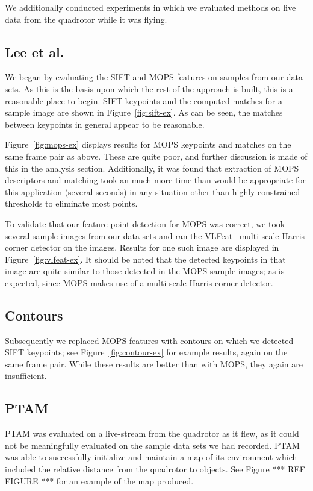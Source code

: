 \documentclass{acmsiggraph}
\begin{document}
We additionally conducted experiments in which we evaluated methods on live data from the quadrotor while it was flying.

\subsection{Lee et al.}
We began by evaluating the SIFT and MOPS features on samples from our data sets. As this is the basis upon which the rest of the approach is built, this is a reasonable place to begin. SIFT keypoints and the computed matches for a sample image are shown in Figure~\ref{fig:sift-ex}. As can be seen, the matches between keypoints in general appear to be reasonable.

Figure~\ref{fig:mops-ex} displays results for MOPS keypoints and matches on the same frame pair as above. These are quite poor, and further discussion is made of this in the analysis section. Additionally, it was found that extraction of MOPS descriptors and matching took an much more time than would be appropriate for this application (several seconds) in any situation other than highly constrained thresholds to eliminate most points.

To validate that our feature point detection for MOPS was correct, we took several sample images from our data sets and ran the VLFeat~\cite{vlfeat} multi-scale Harris corner detector on the images. Results for one such image are displayed in Figure~\ref{fig:vlfeat-ex}. It should be noted that the detected keypoints in that image are quite similar to those detected in the MOPS sample images; as is expected, since MOPS makes use of a multi-scale Harris corner detector.

\subsection{Contours}
Subsequently we replaced MOPS features with contours on which we detected SIFT keypoints; see Figure~\ref{fig:contour-ex} for example results, again on the same frame pair. While these results are better than with MOPS, they again are insufficient.

\subsection{PTAM}
PTAM was evaluated on a live-stream from the quadrotor as it flew, as it could not be meaningfully evaluated on the sample data sets we had recorded. PTAM was able to successfully initialize and maintain a map of its environment which included the relative distance from the quadrotor to objects. See Figure *** REF FIGURE *** for an example of the map produced.
\end{document}
